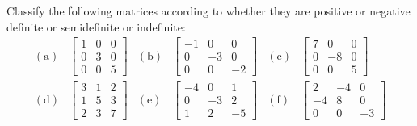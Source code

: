 \begin{problem}[Basic]\cite[p.31, \#2]{peressini1988mathematics}
Classify the following matrices according to whether they are positive or negative definite or semidefinite or indefinite:
\begin{align*}
\mathrm{(a)} & \begin{bmatrix} 1 & 0 & 0 \\ 0 & 3 & 0 \\ 0 & 0 & 5 \end{bmatrix}  &
\mathrm{(b)} & \begin{bmatrix} -1 & 0 & 0 \\ 0 & -3 & 0 \\ 0 & 0 & -2 \end{bmatrix} &
\mathrm{(c)} & \begin{bmatrix} 7 & 0 & 0 \\ 0 & -8 & 0 \\ 0 & 0 & 5 \end{bmatrix}  \\
\mathrm{(d)} & \begin{bmatrix} 3 & 1 & 2 \\ 1 & 5 & 3 \\ 2 & 3 & 7 \end{bmatrix}  &
\mathrm{(e)} & \begin{bmatrix} -4 & 0 & 1 \\ 0 & -3 & 2 \\ 1 & 2 & -5 \end{bmatrix}  &
\mathrm{(f)} & \begin{bmatrix} 2 & -4 & 0 \\ -4 & 8 & 0 \\ 0 & 0 & -3 \end{bmatrix} 
\end{align*}
\end{problem}

